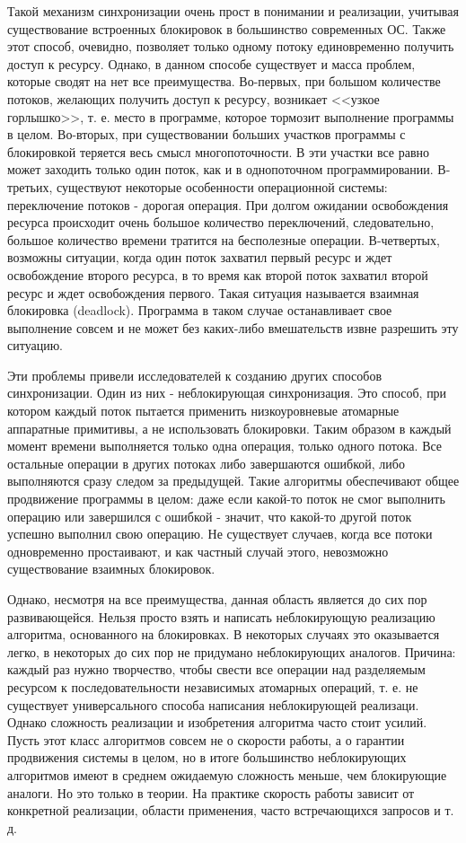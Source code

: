 \documentclass[12pt]{article}
\begin{document}
{			\par Такой механизм синхронизации очень прост в понимании и реализации, учитывая существование встроенных блокировок в большинство современных ОС. Также этот способ, очевидно, позволяет только одному потоку единовременно получить доступ к ресурсу. Однако, в данном способе существует и масса проблем, которые сводят на нет все преимущества. Во-первых, при большом количестве потоков, желающих получить доступ к ресурсу, возникает <<узкое горлышко>>, т. е. место в программе, которое тормозит выполнение программы в целом. Во-вторых, при существовании больших участков программы с блокировкой теряется весь смысл многопоточности. В эти участки все равно может заходить только один поток, как и в однопоточном программировании. В-третьих, существуют некоторые особенности операционной системы: переключение потоков - дорогая операция. При долгом ожидании освобождения ресурса происходит очень большое количество переключений, следовательно, большое количество времени тратится на бесполезные операции. В-четвертых, возможны ситуации, когда один поток захватил первый ресурс и ждет освобождение второго ресурса, в то время как второй поток захватил второй ресурс и ждет освобождения первого. Такая ситуация называется взаимная блокировка (deadlock). Программа в таком случае останавливает свое выполнение совсем и не может без каких-либо вмешательств извне разрешить эту ситуацию.
			\par Эти проблемы привели исследователей к созданию других способов синхронизации. Один из них - неблокирующая синхронизация. Это способ, при котором каждый поток пытается применить низкоуровневые атомарные аппаратные примитивы, а не использовать блокировки. Таким образом в каждый момент времени выполняется только одна операция, только одного потока. Все остальные операции в других потоках либо завершаются ошибкой, либо выполняются сразу следом за предыдущей. Такие алгоритмы обеспечивают общее продвижение программы в целом: даже если какой-то поток не смог выполнить операцию или завершился с ошибкой - значит, что какой-то другой поток успешно выполнил свою операцию. Не существует случаев, когда все потоки одновременно простаивают, и как частный случай этого, невозможно существование взаимных блокировок. 
			\par Однако, несмотря на все преимущества, данная область является до сих пор развивающейся. Нельзя просто взять и написать неблокирующую реализацию алгоритма, основанного на блокировках. В некоторых случаях это оказывается легко, в некоторых до сих пор не придумано неблокирующих аналогов. Причина: каждый раз нужно творчество, чтобы свести все операции над разделяемым ресурсом к последовательности независимых атомарных операций, т. е. не существует универсального способа написания неблокирующей реализаци. Однако сложность реализации и изобретения алгоритма часто стоит усилий. Пусть этот класс алгоритмов совсем не о скорости работы, а о гарантии продвижения системы в целом, но в итоге большинство неблокирующих алгоритмов имеют в среднем ожидаемую сложность меньше, чем блокирующие аналоги. Но это только в теории. На практике скорость работы зависит от конкретной реализации, области применения, часто встречающихся запросов и т. д.
}
\end{document}
